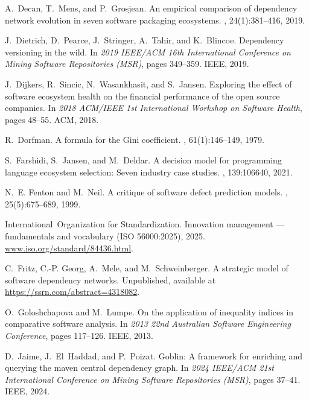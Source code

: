 \documentclass[10pt,conference]{IEEEtran}
\begin{document}
\begin{thebibliography}{10}
A.~Decan, T.~Mens, and P.~Grosjean.
\newblock An empirical comparison of dependency network evolution in seven
  software packaging ecosystems.
, 24(1):381--416, 2019.

J.~Dietrich, D.~Pearce, J.~Stringer, A.~Tahir, and K.~Blincoe.
\newblock Dependency versioning in the wild.
\newblock In {\em 2019 IEEE/ACM 16th International Conference on Mining
  Software Repositories (MSR)}, pages 349--359. IEEE, 2019.

J.~Dijkers, R.~Sincic, N.~Wasankhasit, and S.~Jansen.
\newblock Exploring the effect of software ecosystem health on the financial
  performance of the open source companies.
\newblock In {\em 2018 ACM/IEEE 1st International Workshop on Software Health},
  pages 48--55. ACM, 2018.

R.~Dorfman.
\newblock A formula for the {Gini} coefficient.
, 61(1):146--149, 1979.

S.~Farshidi, S.~Jansen, and M.~Deldar.
\newblock A decision model for programming language ecosystem selection: Seven
  industry case studies.
, 139:106640, 2021.

N.~E. Fenton and M.~Neil.
\newblock A critique of software defect prediction models.
, 25(5):675--689,
  1999.

International~Organization for Standardization.
\newblock Innovation management — fundamentals and vocabulary ({ISO}
  56000:2025), 2025.
\newblock
  \href{https://www.iso.org/standard/84436.html}{www.iso.org/standard/84436.html}.

C.~Fritz, C.-P. Georg, A.~Mele, and M.~Schweinberger.
\newblock A strategic model of software dependency networks.
\newblock Unpublished, available at \url{https://ssrn.com/abstract=4318082}.

O.~Goloshchapova and M.~Lumpe.
\newblock On the application of inequality indices in comparative software
  analysis.
\newblock In {\em 2013 22nd Australian Software Engineering Conference}, pages
  117--126. IEEE, 2013.

D.~Jaime, J.~El~Haddad, and P.~Poizat.
\newblock Goblin: A framework for enriching and querying the maven central
  dependency graph.
\newblock In {\em 2024 IEEE/ACM 21st International Conference on Mining
  Software Repositories (MSR)}, pages 37--41. IEEE, 2024.


\end{thebibliography}
\end{document}
